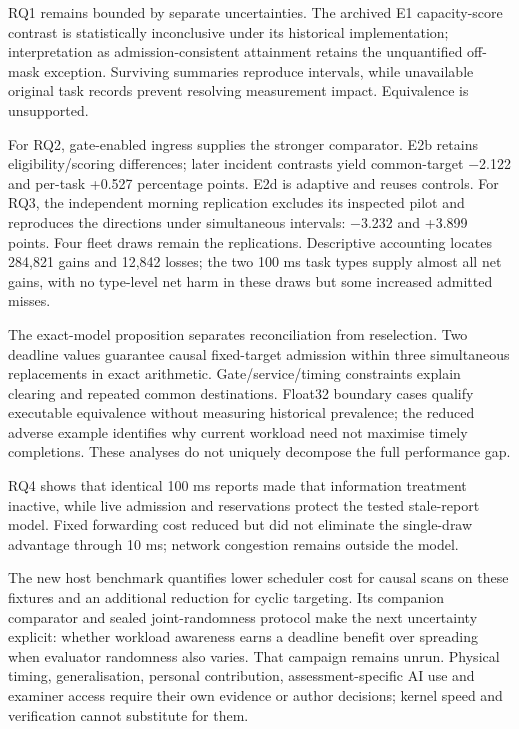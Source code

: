 \documentclass[11pt,a4paper]{article}
\begin{document}
RQ1 remains bounded by separate uncertainties. The archived E1 capacity-score contrast is statistically inconclusive under its historical implementation; interpretation as admission-consistent attainment retains the unquantified off-mask exception. Surviving summaries reproduce intervals, while unavailable original task records prevent resolving measurement impact. Equivalence is unsupported.

For RQ2, gate-enabled ingress supplies the stronger comparator. E2b retains eligibility/scoring differences; later incident contrasts yield common-target \ensuremath{-}2.122 and per-task +0.527 percentage points. E2d is adaptive and reuses controls. For RQ3, the independent morning replication excludes its inspected pilot and reproduces the directions under simultaneous intervals: \ensuremath{-}3.232 and +3.899 points. Four fleet draws remain the replications. Descriptive accounting locates 284,821 gains and 12,842 losses; the two 100 ms task types supply almost all net gains, with no type-level net harm in these draws but some increased admitted misses.

The exact-model proposition separates reconciliation from reselection. Two deadline values guarantee causal fixed-target admission within three simultaneous replacements in exact arithmetic. Gate/service/timing constraints explain clearing and repeated common destinations. Float32 boundary cases qualify executable equivalence without measuring historical prevalence; the reduced adverse example identifies why current workload need not maximise timely completions. These analyses do not uniquely decompose the full performance gap.

RQ4 shows that identical 100 ms reports made that information treatment inactive, while live admission and reservations protect the tested stale-report model. Fixed forwarding cost reduced but did not eliminate the single-draw advantage through 10 ms; network congestion remains outside the model.

The new host benchmark quantifies lower scheduler cost for causal scans on these fixtures and an additional reduction for cyclic targeting. Its companion comparator and sealed joint-randomness protocol make the next uncertainty explicit: whether workload awareness earns a deadline benefit over spreading when evaluator randomness also varies. That campaign remains unrun. Physical timing, generalisation, personal contribution, assessment-specific AI use and examiner access require their own evidence or author decisions; kernel speed and verification cannot substitute for them.
\end{document}
